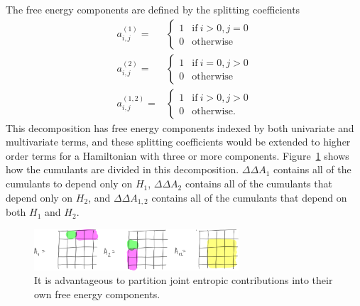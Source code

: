 \documentclass{article}
\begin{document}
The free energy components are defined by the splitting coefficients
\begin{align}
a_{i,j}^{(1)} =&
	\begin{cases}
	1 &\text{if}\ i>0,  j=0 \\
	0 &\text{otherwise}
	\end{cases} \nonumber \\
a_{i,j}^{(2)} =&
	\begin{cases}
	1 &\text{if}\ i=0,  j>0  \\
	0 &\text{otherwise}
	\end{cases}  \nonumber \\
a_{i,j}^{(1,2)} =&
	\begin{cases}
	1 &\text{if}\ i>0,  j>0 \\
	0 &\text{otherwise}.
	\end{cases} \label{eq:splitCoeffsGood}
\end{align}
This decomposition has free energy components indexed by both univariate and multivariate terms, 
and these splitting coefficients would be extended to higher order terms for a Hamiltonian with three or more components. Figure~\ref{fig:good_split} shows how the cumulants are divided in this decomposition. $\Delta\Delta A_1$ contains all of the cumulants to depend only on $H_1$, $\Delta\Delta A_2$ contains all of the cumulants that depend only on $H_2$, and $\Delta\Delta A_{1,2}$ contains all of the cumulants that depend on both $H_1$ and $H_2$. 


\begin{figure}[tb]
\centering
\includegraphics[width=3in]{figure5.pdf}
\caption{It is advantageous to partition joint entropic contributions into their own free energy components.}
\label{fig:good_split}
\end{figure}
\end{document}
